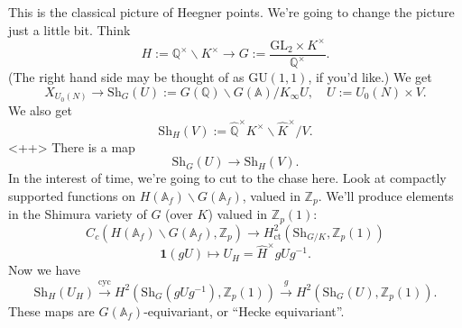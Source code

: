 \documentclass[reqno]{amsart} 
\begin{document}
This is the classical picture of Heegner points.  We're going to change the picture just a little bit.  Think
\begin{equation}\label{eq:cq6s0mlq0m}
  H := \mathbb{Q}^\times \backslash K^\times \rightarrow G := \frac{\mathrm{GL}_2 \times K^\times}{\mathbb{Q}^\times}.
\end{equation}
(The right hand side may be thought of as $\mathrm{GU}(1, 1)$, if you'd like.)  We get
\begin{equation*}
  X_{U_0(N)} \rightarrow
  \mathrm{S h}_G(U) := G(\mathbb{Q}) \backslash G(\mathbb{A}) / K_\infty U, \quad U := U_0(N) \times V.
\end{equation*}
We also get
\begin{equation*}
  \mathrm{S h}_H(V) := \hat{\mathbb{Q}}^\times K^\times \backslash \hat{K}^\times / V.
\end{equation*}<++>
There is a map
\begin{equation*}
  \mathrm{S h}_G(U) \rightarrow \mathrm{Sh}_H(V).
\end{equation*}
In the interest of time, we're going to cut to the chase here.  Look at compactly supported functions on $H(\mathbb{A}_f) \backslash G(\mathbb{A}_f)$, valued in $\mathbb{Z}_p$.  We'll produce elements in the Shimura variety of $G$ (over $K$) valued in $\mathbb{Z}_p(1)$:
\begin{equation}\label{eq:cq6s0i3k4v}
  C_c(H(\mathbb{A}_f) \backslash G(\mathbb{A}_f), \mathbb{Z}_p)
  \rightarrow H^2_{\mathrm{ct}}(\mathrm{S h}_{G /K}, \mathbb{Z}_p(1))
\end{equation}
\begin{equation*}
  \mathbf{1}(g U) \mapsto U_H = \hat{H}^\times g U g^{-1}.
\end{equation*}
Now we have
\begin{equation*}
  \mathrm{Sh}_H(U_H) \xrightarrow{\mathrm{cyc}}
  H^2(\mathrm{Sh}_G(g U g^{-1}), \mathbb{Z}_p(1)) \xrightarrow{g}
  H^2(\mathrm{Sh}_G(U), \mathbb{Z}_p(1)).
\end{equation*}
These maps are $G(\mathbb{A}_f)$-equivariant, or ``Hecke equivariant''.
\end{document}
